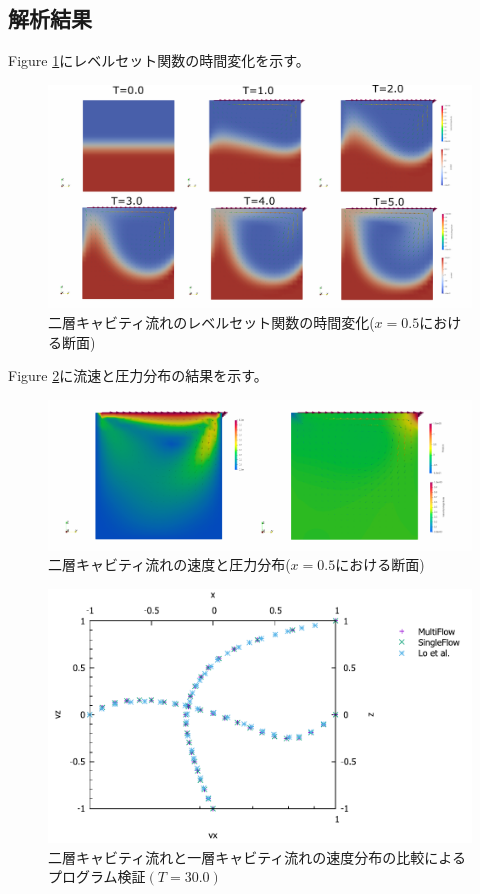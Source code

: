 \documentclass[8pt,a4paper]{article}
\begin{document}
\subsection{解析結果}

Figure \ref{fig:3d-cavity-result-levelset}にレベルセット関数の時間変化を示す。
\begin{figure}[H]
	\centering
	\includegraphics[width=18truecm]{pics/3d-cavity/levelset_velocity.pdf}
	\caption{二層キャビティ流れのレベルセット関数の時間変化($x=0.5$における断面)}
	\label{fig:3d-cavity-result-levelset}
\end{figure}

Figure \ref{fig:3d-cavity-result-velocity-pressure}に流速と圧力分布の結果を示す。
\begin{figure}[H]
	\centering
	\includegraphics[width=18truecm]{pics/3d-cavity/velocity_pressure.pdf}
	\caption{二層キャビティ流れの速度と圧力分布($x=0.5$における断面)}
	\label{fig:3d-cavity-result-velocity-pressure}
\end{figure}

\begin{figure}[H]
	\centering
	\includegraphics[width=18truecm]{pics/3d-cavity/velocity_graph.pdf}
	\caption{二層キャビティ流れと一層キャビティ流れの速度分布の比較によるプログラム検証$(T=30.0)$}
	\label{fig:3d-cavity_velocity_graph}
\end{figure}
\end{document}
